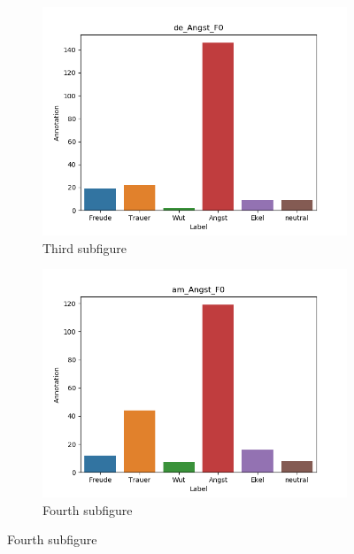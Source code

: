 \documentclass[11pt,a4paper,headsepline,twoside,toc=bibliography]{scrreprt}
\begin{document}
\begin{figure}[t!]
	\medskip
	\begin{subfigure}{0.48\textwidth}
		\includegraphics[width=\linewidth]{plots/de_Angst_F0.png}
		\caption{Third subfigure} \label{fig:de_A_F0}
	\end{subfigure}\hspace*{\fill}
	\begin{subfigure}{0.48\textwidth}
		\includegraphics[width=\linewidth]{plots/am_Angst_F0.png}
		\caption{Fourth subfigure} \label{fig:am_A_F0}
	\end{subfigure}
	

\end{figure}
\end{document}
